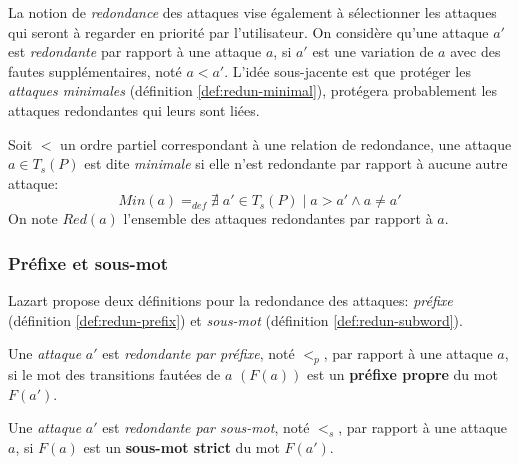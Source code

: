             La notion de \textit{redondance} des attaques vise également à sélectionner les attaques qui seront à regarder en priorité par l'utilisateur.
            On considère qu'une attaque $a'$ est \textit{redondante} par rapport à une attaque $a$, si $a'$ est une variation de $a$ avec des fautes supplémentaires, noté $a < a'$.
            L'idée sous-jacente est que protéger les \textit{attaques minimales} (définition \ref{def:redun-minimal}), protégera probablement les attaques redondantes qui leurs sont liées.
            
            \begin{defi}[Terminologie]
                \label{def:redun-minimal}
                Soit $<$ un ordre partiel correspondant à une relation de redondance, une attaque $a \in T_s(P)$ est dite \textit{minimale} si elle n'est redondante par rapport à aucune autre attaque:
                    \[  
                    Min(a) =_{def} \nexists \; a' \in T_s(P) \mid a > a' \land a \neq a'
                    \] 
                On note $Red(a)$ l'ensemble des attaques redondantes par rapport à $a$.
            \end{defi}
            
            \subsubsection{Préfixe et sous-mot}
            
            Lazart propose deux définitions pour la redondance des attaques: \textit{préfixe} (définition \ref{def:redun-prefix}) et \textit{sous-mot} (définition \ref{def:redun-subword}).
            
            \begin{defi}
                \label{def:redun-prefix}
                Une \textit{attaque} $a'$ est \textit{redondante par préfixe}, noté $<_p$, par rapport à une attaque $a$, si le mot des transitions fautées de $a$ $(F(a))$ est un \textbf{préfixe propre} du mot $F(a')$.
            \end{defi}
            
            \begin{defi}
                \label{def:redun-subword}
                Une \textit{attaque} $a'$ est \textit{redondante par sous-mot}, noté $<_s$, par rapport à une attaque $a$, si $F(a)$ est un \textbf{sous-mot strict} du mot $F(a')$.
            \end{defi}
            
